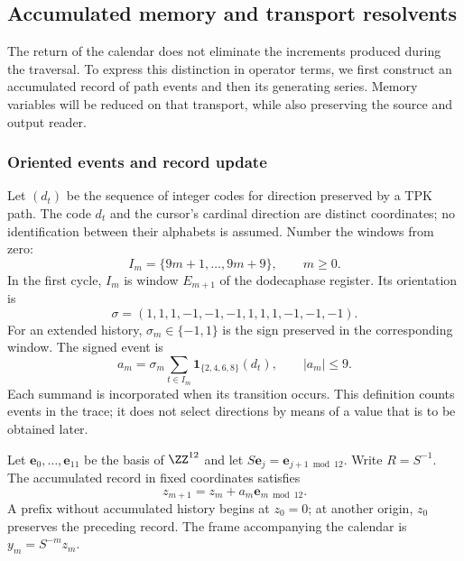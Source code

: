 \subsection{Accumulated memory and transport resolvents}
\label{subsec:memoria-resolvente}

The return of the calendar does not eliminate the increments produced during
the traversal. To express this distinction in operator terms, we first construct
an accumulated record of path events and then its
generating series. Memory variables will be reduced on
that transport, while also preserving the source and output reader.

\subsubsection{Oriented events and record update}

Let \((d_t)\) be the sequence of integer codes for direction preserved
by a TPK path. The code \(d_t\) and the cursor's cardinal direction
are distinct coordinates; no identification between their alphabets
is assumed. Number the windows from zero:
\[
 I_m=\{9m+1,\ldots,9m+9\},\qquad m\geq0.
\]
In the first cycle, \(I_m\) is window \(E_{m+1}\) of the
dodecaphase register. Its orientation is
\[
 \sigma=(1,1,1,-1,-1,-1,1,1,1,-1,-1,-1).
\]
For an extended history, \(\sigma_m\in\{-1,1\}\) is the sign
preserved in the corresponding window. The signed event is
\begin{equation}
 a_m=\sigma_m\sum_{t\in I_m}
       \mathbf1_{\{2,4,6,8\}}(d_t),\qquad |a_m|\leq9.
 \label{mem:evento}
\end{equation}
Each summand is incorporated when its transition occurs. This definition
counts events in the trace; it does not select directions by means of a value
that is to be obtained later.

Let \(\mathbf e_0,\ldots,\mathbf e_{11}\) be the basis of \(\ZZ^{12}\)
and let \(S\mathbf e_j=\mathbf e_{j+1\bmod12}\). Write
\(R=S^{-1}\). The accumulated record in fixed coordinates satisfies
\[
z_{m+1}=z_m+a_m\mathbf e_{m\bmod12}.
\]
A prefix without accumulated history begins at \(z_0=0\); at another
origin, \(z_0\) preserves the preceding record.
The frame accompanying the calendar is \(y_m=S^{-m}z_m\).

